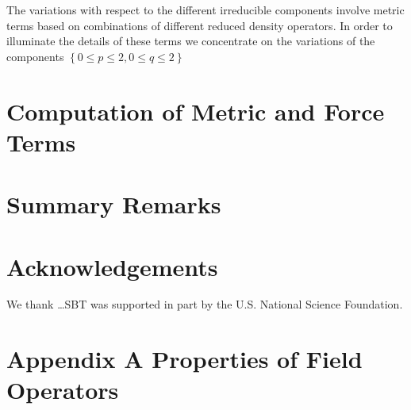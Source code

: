 \documentclass[aps,preprint]{revtex4}%
\begin{document}
The variations with respect to the different irreducible components involve
metric terms based on combinations of different reduced density operators. In
order to illuminate the details of these terms we concentrate on the
variations of the components $\left\{  0\leq p\leq2,0\leq q\leq2\right\}  $

\section{Computation of Metric and Force Terms}

\section{Summary Remarks}

\section{Acknowledgements}

We thank \ldots SBT was supported in part by the U.S. National Science Foundation.

\section{Appendix A Properties of Field Operators}
\end{document}
